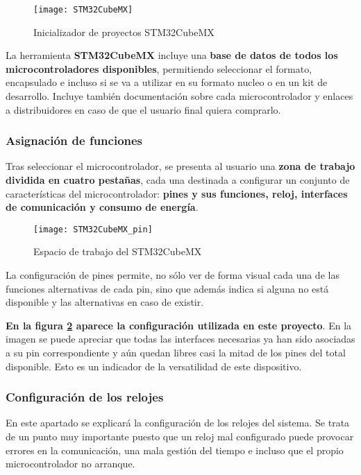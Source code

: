 \begin{figure} [h]
    \centering
    \texttt{[image: STM32CubeMX]}
    \caption{Inicializador de proyectos STM32CubeMX}
    \label{fig:STM32CubeMX}
\end{figure}

La herramienta \textbf{STM32CubeMX} incluye una \textbf{base de datos de todos los microcontroladores disponibles}, permitiendo seleccionar el formato, encapsulado e incluso si se va a utilizar en su formato nucleo o en un kit de desarrollo. Incluye también documentación sobre cada microcontrolador y enlaces a distribuidores en caso de que el usuario final quiera comprarlo. 

\subsubsection{Asignación de funciones\label{sec:Configuracion_micro_asignacion}}

Tras seleccionar el microcontrolador, se presenta al usuario una \textbf{zona de trabajo dividida en cuatro pestañas}, cada una destinada a configurar un conjunto de características del microcontrolador: \textbf{pines y sus funciones, reloj, interfaces de comunicación y consumo de energía}.

\begin{figure} [h]
    \centering
    \texttt{[image: STM32CubeMX\_pin]}
    \caption{Espacio de trabajo del STM32CubeMX}
    \label{fig:STM32CubeMX_pin}
\end{figure}

La configuración de pines permite, no sólo ver de forma visual cada una de las funciones alternativas de cada pin, sino que además indica si alguna no está disponible y las alternativas en caso de existir.

\textbf{En la figura \ref{fig:STM32CubeMX_pin} aparece la configuración utilizada en este proyecto}. En la imagen se puede apreciar que todas las interfaces necesarias ya han sido asociadas a su pin correspondiente y aún quedan libres casi la mitad de los pines del total disponible. Esto es un indicador de la versatilidad de este dispositivo.

\subsubsection{Configuración de los relojes\label{sec:Configuracion_micro_reloj}}

En este apartado se explicará la configuración de los relojes del sistema. Se trata de un punto muy importante puesto que un reloj mal configurado puede provocar errores en la comunicación, una mala gestión del tiempo e incluso que el propio microcontrolador no arranque.

